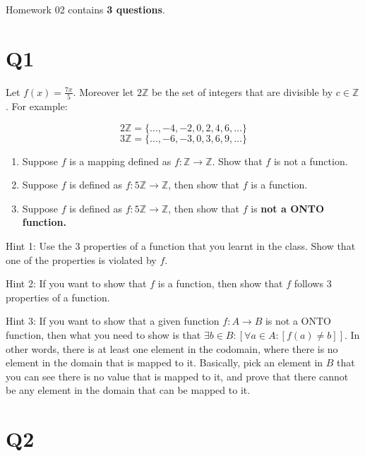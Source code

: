 \documentclass[12pt]{exam}
\begin{document}
Homework 02 contains \textbf{3 questions}.

\section{Q1}
Let $f(x) = \frac{7x}{5}$. Moreover let $2\mathds{Z}$ be the set of integers that are divisible by $c \in \mathds{Z}$. For example:

\[2\mathds{Z} = \{\ldots, -4, -2, 0, 2, 4, 6, \ldots\}\]
\[3\mathds{Z} = \{\ldots, -6, -3, 0, 3, 6, 9, \ldots\}\]

\begin{enumerate}
    \item Suppose $f$ is a mapping defined as $f : \mathds{Z} \rightarrow \mathds{Z}$. Show that $f$ is not a function.
    \item Suppose $f$ is defined as $f: 5\mathds{Z} \rightarrow \mathds{Z}$, then show that $f$ is a function.
    \item Suppose $f$ is defined as $f: 5\mathds{Z} \rightarrow \mathds{Z}$, then show that $f$ is \textbf{not a ONTO function.}
\end{enumerate}

Hint 1: Use the $3$ properties of a function that you learnt in the class. Show that one of the properties is violated by $f$.

Hint 2: If you want to show that $f$ is a function, then show that $f$ follows $3$ properties of a function.

Hint 3: If you want to show that a given function $f: A \rightarrow B$ is not a ONTO function, then what you need to show is that $\exists b \in B: [\forall a \in A: [f(a) \neq b]]$. In other words, there is at least one element in the codomain, where there is no element in the domain that is mapped to it. Basically, pick an element in $B$ that you can see there is no value that is mapped to it, and prove that there cannot be any element in the domain that can be mapped to it.


\section{Q2} 
\end{document}
